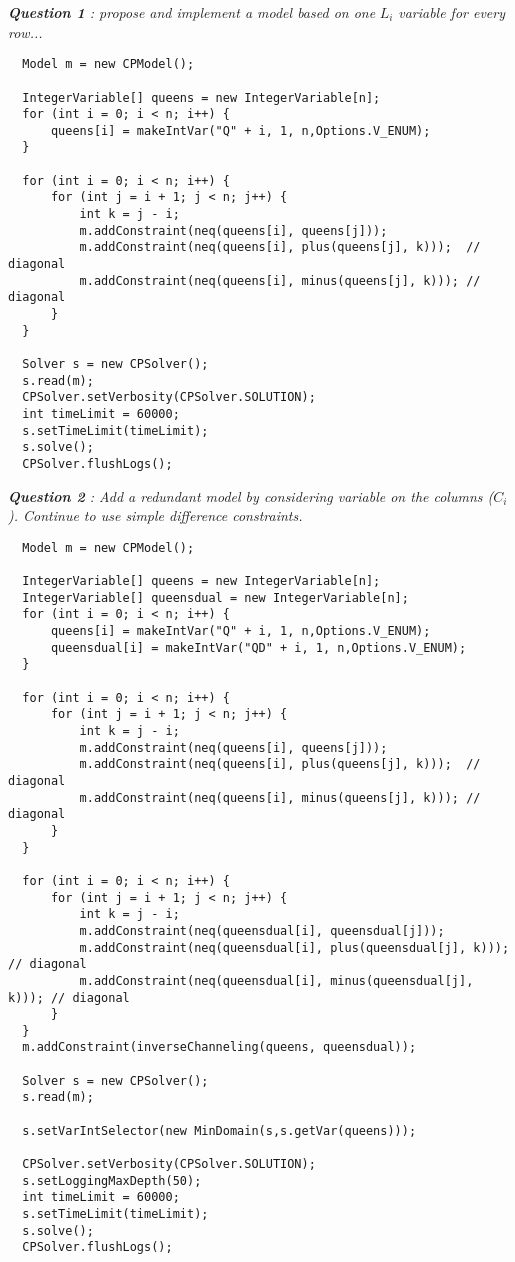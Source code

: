 \noindent\emph{\textbf{Question 1} : propose and implement a model based on one} $L_{i}$ \emph{variable for every row...}
\begin{lstlisting}
  Model m = new CPModel();
  
  IntegerVariable[] queens = new IntegerVariable[n];
  for (int i = 0; i < n; i++) {
      queens[i] = makeIntVar("Q" + i, 1, n,Options.V_ENUM);
  }
	
  for (int i = 0; i < n; i++) {
      for (int j = i + 1; j < n; j++) {
          int k = j - i;
          m.addConstraint(neq(queens[i], queens[j]));
          m.addConstraint(neq(queens[i], plus(queens[j], k)));  // diagonal
          m.addConstraint(neq(queens[i], minus(queens[j], k))); // diagonal
      }
  }
	
  Solver s = new CPSolver();
  s.read(m);
  CPSolver.setVerbosity(CPSolver.SOLUTION);
  int timeLimit = 60000;
  s.setTimeLimit(timeLimit);
  s.solve();
  CPSolver.flushLogs();
\end{lstlisting}

\noindent\emph{\textbf{Question 2} : Add a redundant model by considering variable on the columns ($C_i$). Continue to use simple difference constraints.}

\begin{lstlisting}
  Model m = new CPModel();
	
  IntegerVariable[] queens = new IntegerVariable[n];
  IntegerVariable[] queensdual = new IntegerVariable[n];
  for (int i = 0; i < n; i++) {
      queens[i] = makeIntVar("Q" + i, 1, n,Options.V_ENUM);
      queensdual[i] = makeIntVar("QD" + i, 1, n,Options.V_ENUM);
  }
	
  for (int i = 0; i < n; i++) {
      for (int j = i + 1; j < n; j++) {
          int k = j - i;
          m.addConstraint(neq(queens[i], queens[j]));
          m.addConstraint(neq(queens[i], plus(queens[j], k)));  // diagonal
          m.addConstraint(neq(queens[i], minus(queens[j], k))); // diagonal
      }
  }

  for (int i = 0; i < n; i++) {
      for (int j = i + 1; j < n; j++) {
          int k = j - i;
          m.addConstraint(neq(queensdual[i], queensdual[j]));
          m.addConstraint(neq(queensdual[i], plus(queensdual[j], k)));  // diagonal
          m.addConstraint(neq(queensdual[i], minus(queensdual[j], k))); // diagonal
      }
  }
  m.addConstraint(inverseChanneling(queens, queensdual));
  
  Solver s = new CPSolver();
  s.read(m);
  
  s.setVarIntSelector(new MinDomain(s,s.getVar(queens)));
  
  CPSolver.setVerbosity(CPSolver.SOLUTION);
  s.setLoggingMaxDepth(50);
  int timeLimit = 60000;
  s.setTimeLimit(timeLimit);
  s.solve();
  CPSolver.flushLogs();
\end{lstlisting}

